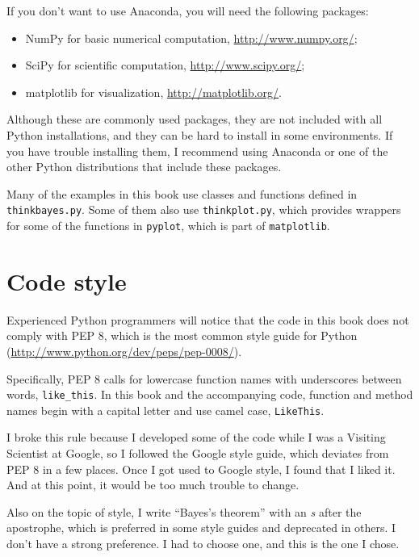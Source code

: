 \documentclass[12pt]{book}
\begin{document}
If you don't want to use Anaconda, you will need the following
packages:

\begin{itemize}

\item NumPy for basic numerical computation, \url{http://www.numpy.org/};

\item SciPy for scientific computation,
  \url{http://www.scipy.org/};

\item matplotlib for visualization, \url{http://matplotlib.org/}.

\end{itemize}

Although these are commonly used packages, they are not included with
all Python installations, and they can be hard to install in some
environments.  If you have trouble installing them, I
recommend using Anaconda or one of the other Python distributions
that include these packages.

Many of the examples in this book use classes and functions defined in
{\tt thinkbayes.py}.  Some of them also use {\tt thinkplot.py}, which
provides wrappers for some of the functions in {\tt pyplot}, which is
part of {\tt matplotlib}.  


\section{Code style}

Experienced Python programmers will notice that the code in this
book does not comply with PEP 8, which is the most common
style guide for Python (\url{http://www.python.org/dev/peps/pep-0008/}).

Specifically, PEP 8 calls for lowercase function names with
underscores between words, \verb"like_this".  In this book and
the accompanying code, function and method names begin with
a capital letter and use camel case, \verb"LikeThis".

I broke this rule because I developed some of the code
while I was a Visiting Scientist at Google, so I followed
the Google style guide, which deviates from PEP 8 in a few
places.  Once I got used to Google style, I found that I liked
it.  And at this point, it would be too much trouble to change.

Also on the topic of style, I write ``Bayes's theorem''
with an {\it s} after the apostrophe, which is preferred in some
style guides and deprecated in others.  I don't have a strong
preference.  I had to choose one, and this is the one I chose.
\end{document}

